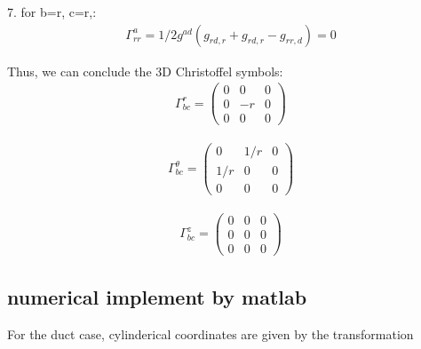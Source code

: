 \documentclass{Note}
\begin{document}
7. for b=r, c=r,:
\begin{equation}
\begin{aligned}
\Gamma_{rr}^a=1/2 g^{ad}(g_{rd,r}+g_{rd,r}-g_{rr,d})=0
\end{aligned}
\end{equation}

Thus, we can conclude the 3D Christoffel symbols:
\begin{equation}
\begin{aligned}
\Gamma_{bc}^r=
\begin{pmatrix}
0 & 0 & 0\\ 0 &-r & 0\\0 & 0 &0
\end{pmatrix}
\end{aligned}
\end{equation}

\begin{equation}
\begin{aligned}
\Gamma_{bc}^\theta=
\begin{pmatrix}
0 & 1/r & 0\\1/r &0 & 0\\0 & 0 &0
\end{pmatrix}
\end{aligned}
\end{equation}

\begin{equation}
\begin{aligned}
\Gamma_{bc}^z=
\begin{pmatrix}
0 & 0 & 0\\ 0 &0 & 0\\0 & 0 &0
\end{pmatrix}
\end{aligned}
\end{equation}


\subsection{numerical implement by matlab}
	For the duct case, cylinderical coordinates are given by the transformation
\end{document}
